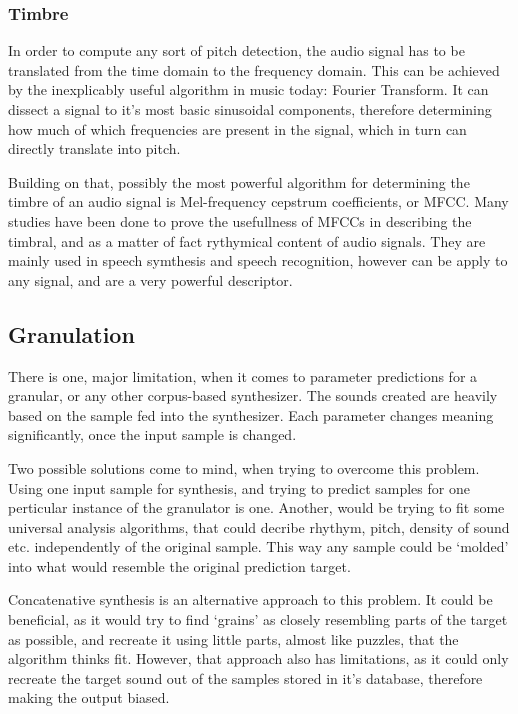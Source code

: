 \subsubsection{Timbre}

In order to compute any sort of pitch detection, the audio signal has
to be translated from the time domain to the frequency domain. This
can be achieved by the inexplicably useful algorithm in music today: 
Fourier Transform. It can dissect a signal to it's most basic
sinusoidal components, therefore determining how much of which
frequencies are present in the signal, which in turn can directly
translate into pitch.

Building on that, possibly the most powerful algorithm for determining
the timbre of an audio signal is Mel-frequency cepstrum coefficients,
or MFCC. Many studies have been done to prove the usefullness of MFCCs
in describing the timbral, and as a matter of fact rythymical content
of audio signals. They are mainly used in speech symthesis and speech
recognition, however can be apply to any signal, and are a very
powerful descriptor.

\subsection{Granulation}

There is one, major limitation, when it comes to parameter predictions
for a granular, or any other corpus-based synthesizer. The sounds
created are heavily based on the sample fed into the synthesizer. Each
parameter changes meaning significantly, once the input sample is
changed. 

Two possible solutions come to mind, when trying to overcome this
problem. Using one input sample for synthesis, and trying
to predict samples for one perticular instance of the granulator is one.
Another, would be trying to fit some universal analysis algorithms,
that could decribe rhythym, pitch, density of sound etc. independently
of the original sample. This way any sample could be `molded' into
what would resemble the original prediction target. 

Concatenative synthesis is an alternative approach to this problem. It
could be beneficial, as it would try to find `grains' as closely
resembling parts of the target as possible, and recreate it using
little parts, almost like puzzles, that the algorithm thinks
fit. However, that approach also has limitations, as it could only
recreate the target sound out of the samples stored in it's database,
therefore making the output biased.

